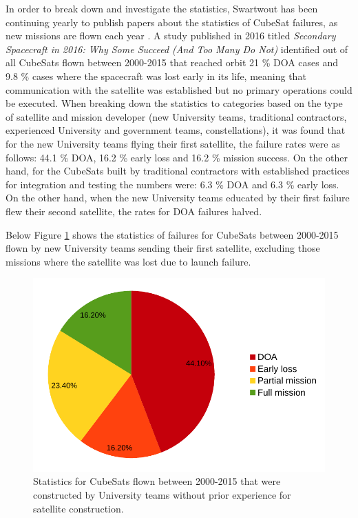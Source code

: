 \documentclass[english,12pt,a4paper,pdftex,elec,utf8]{aaltothesis}
\begin{document}
In order to break down and investigate the statistics, Swartwout has been continuing yearly to publish papers about the statistics of CubeSat failures, as new missions are flown each year \cite{Swart2016, Swart2015}. A study published in 2016 titled \textit{Secondary Spacecraft in 2016: Why Some Succeed (And Too Many Do Not)} identified out of all CubeSats flown between 2000-2015 that reached orbit 21 \% DOA cases and 9.8 \% cases where the spacecraft was lost early in its life, meaning that communication with the satellite was established but no primary operations could be executed. When breaking down the statistics to categories based on the type of satellite and mission developer (new University teams, traditional contractors, experienced University and government teams, constellations), it was found that for the new University teams flying their first satellite, the failure rates were as follows: 44.1 \% DOA, 16.2 \% early loss and 16.2 \% mission success. On the other hand, for the CubeSats built by traditional contractors with established practices for integration and testing the numbers were: 6.3 \% DOA and 6.3 \% early loss. On the other hand, when the new University teams educated by their first failure flew their second satellite, the rates for DOA failures halved. \cite{Swart2016, Swart2015}\par 
Below Figure \ref{hobbyistflown2015pic} shows the statistics of failures for CubeSats between 2000-2015 flown by new University teams sending their first satellite, excluding those missions where the satellite was lost due to launch failure.\par 
\begin{figure}[h!]
\centering
\includegraphics[scale=0.5]{university2015}
%
\caption{Statistics for CubeSats flown between 2000-2015 that were constructed by University teams without prior experience for satellite construction. \cite{Swart2016}}
\label{hobbyistflown2015pic}
\end{figure} 
\end{document}
